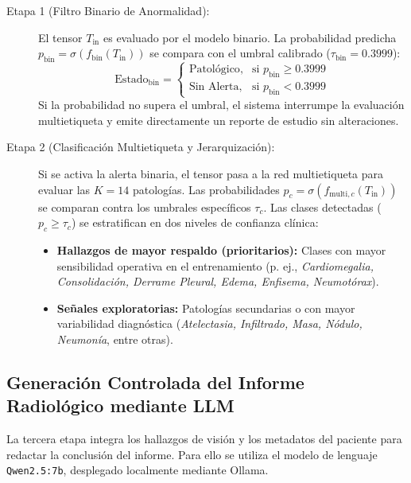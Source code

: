 \documentclass[../main.tex]{subfiles}
\begin{document}
\begin{description}
    \item[Etapa 1 (Filtro Binario de Anormalidad):] El tensor $T_{\text{in}}$ es evaluado por el modelo binario. La probabilidad predicha $p_{\text{bin}} = \sigma(f_{\text{bin}}(T_{\text{in}}))$ se compara con el umbral calibrado ($\tau_{\text{bin}} = 0.3999$):
    \begin{equation}
        \text{Estado}_{\text{bin}} = \begin{cases} 
            \text{Patológico}, & \text{si } p_{\text{bin}} \ge 0.3999 \\ 
            \text{Sin Alerta}, & \text{si } p_{\text{bin}} < 0.3999 
        \end{cases}
    \end{equation}
    Si la probabilidad no supera el umbral, el sistema interrumpe la evaluación multietiqueta y emite directamente un reporte de estudio sin alteraciones.

    \item[Etapa 2 (Clasificación Multietiqueta y Jerarquización):] Si se activa la alerta binaria, el tensor pasa a la red multietiqueta para evaluar las $K=14$ patologías. Las probabilidades $p_c = \sigma(f_{\text{multi}, c}(T_{\text{in}}))$ se comparan contra los umbrales específicos $\tau_c$. Las clases detectadas ($p_c \ge \tau_c$) se estratifican en dos niveles de confianza clínica:
    \begin{itemize}
        \item \textbf{Hallazgos de mayor respaldo (prioritarios):} Clases con mayor sensibilidad operativa en el entrenamiento (p. ej., \textit{Cardiomegalia, Consolidación, Derrame Pleural, Edema, Enfisema, Neumotórax}).
        \item \textbf{Señales exploratorias:} Patologías secundarias o con mayor variabilidad diagnóstica (\textit{Atelectasia, Infiltrado, Masa, Nódulo, Neumonía}, entre otras).
    \end{itemize}
\end{description}

\subsection{Generación Controlada del Informe Radiológico mediante LLM}
La tercera etapa integra los hallazgos de visión y los metadatos del paciente para redactar la conclusión del informe. Para ello se utiliza el modelo de lenguaje \texttt{Qwen2.5:7b}, desplegado localmente mediante Ollama.
\end{document}
